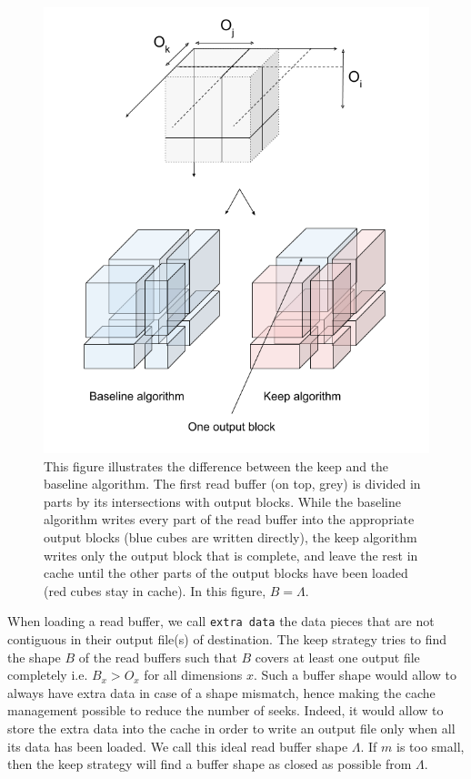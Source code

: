 \documentclass[conference]{IEEEtran}
\begin{document}
\begin{figure}[h]
\centering
\includegraphics[scale=0.4]{./figures/new/figure_2.png}
\caption{This figure illustrates the difference between the keep and the baseline algorithm.
The first read buffer (on top, grey) is divided in parts by its intersections with output blocks.
While the baseline algorithm writes every part of the read buffer into the appropriate output
blocks (blue cubes are written directly), the keep algorithm writes only the output block
that is complete, and leave the rest in cache until the other parts of the output blocks have been
loaded (red cubes stay in cache). In this figure, $B=\Lambda$.
}
\label{fig:keepvsbaseline}
\end{figure}

When loading a read buffer, we call \texttt{extra data} the data pieces that
are not contiguous in their output file(s) of destination.
The keep strategy tries to find the shape $B$ of the read buffers such that $B$ covers
at least one output file completely i.e. $B_x>O_x$ for all dimensions $x$.
Such a buffer shape would allow to always have extra data in case of a shape
mismatch, hence making the cache management possible to reduce the number of seeks.
Indeed, it would allow to store the extra data into the cache in order to write
an output file only when all its data has been loaded.
We call this ideal read buffer shape $\Lambda$.
If $m$ is too small, then the keep strategy will find a buffer
shape as closed as possible from $\Lambda$.
\end{document}
